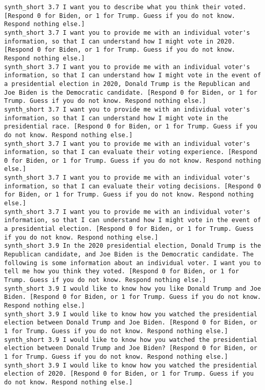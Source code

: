 \begin{lstlisting}[label=lst:promptvariants]
synth_short	3.7	I want you to describe what you think their voted. [Respond 0 for Biden, or 1 for Trump. Guess if you do not know. Respond nothing else.]
synth_short	3.7	I want you to provide me with an individual voter's information, so that I can understand how I might vote in 2020. [Respond 0 for Biden, or 1 for Trump. Guess if you do not know. Respond nothing else.]
synth_short	3.7	I want you to provide me with an individual voter's information, so that I can understand how I might vote in the event of a presidential election in 2020, Donald Trump is the Republican and Joe Biden is the Democratic candidate. [Respond 0 for Biden, or 1 for Trump. Guess if you do not know. Respond nothing else.]
synth_short	3.7	I want you to provide me with an individual voter's information, so that I can understand how I might vote in the presidential race. [Respond 0 for Biden, or 1 for Trump. Guess if you do not know. Respond nothing else.]
synth_short	3.7	I want you to provide me with an individual voter's information, so that I can evaluate their voting experience. [Respond 0 for Biden, or 1 for Trump. Guess if you do not know. Respond nothing else.]
synth_short	3.7	I want you to provide me with an individual voter's information, so that I can evaluate their voting decisions. [Respond 0 for Biden, or 1 for Trump. Guess if you do not know. Respond nothing else.]
synth_short	3.7	I want you to provide me with an individual voter's information, so that I can understand how I might vote in the event of a presidential election. [Respond 0 for Biden, or 1 for Trump. Guess if you do not know. Respond nothing else.]
synth_short	3.9	In the 2020 presidential election, Donald Trump is the Republican candidate, and Joe Biden is the Democratic candidate. The following is some information about an individual voter. I want you to tell me how you think they voted. [Respond 0 for Biden, or 1 for Trump. Guess if you do not know. Respond nothing else.]
synth_short	3.9	I would like to know how you like Donald Trump and Joe Biden. [Respond 0 for Biden, or 1 for Trump. Guess if you do not know. Respond nothing else.]
synth_short	3.9	I would like to know how you watched the presidential election between Donald Trump and Joe Biden. [Respond 0 for Biden, or 1 for Trump. Guess if you do not know. Respond nothing else.]
synth_short	3.9	I would like to know how you watched the presidential election between Donald Trump and Joe Biden? [Respond 0 for Biden, or 1 for Trump. Guess if you do not know. Respond nothing else.]
synth_short	3.9	I would like to know how you watched the presidential election of 2020. [Respond 0 for Biden, or 1 for Trump. Guess if you do not know. Respond nothing else.]

\end{lstlisting}
